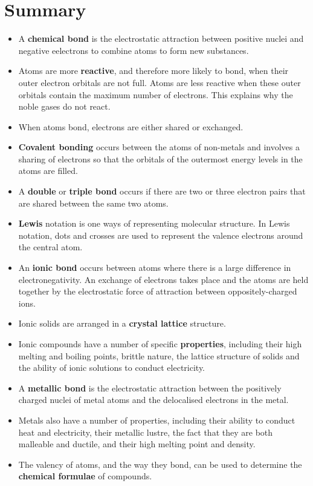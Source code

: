             \section{Summary}
            \nopagebreak
      \label{m38689*id147386}\begin{itemize}[noitemsep]
            \label{m38689*uid136}\item A \textbf{chemical bond} is the electrostatic attraction between positive nuclei and negative eelectrons to combine atoms to form new substances.
\label{m38689*uid137}\item Atoms are more \textbf{reactive}, and therefore more likely to bond, when their outer electron orbitals are not full. Atoms are less reactive when these outer orbitals contain the maximum number of electrons. This explains why the noble gases do not react.
\label{m38689*uid142}\item When atoms bond, electrons are either shared or exchanged.
\label{m38689*uid143}\item \textbf{Covalent bonding} occurs between the atoms of non-metals and involves a sharing of electrons so that the orbitals of the outermost energy levels in the atoms are filled.
\label{m38689*uid145}\item A \textbf{double} or \textbf{triple bond} occurs if there are two or three electron pairs that are shared between the same two atoms.
\label{m38689*uid147}\item \textbf{Lewis} notation is one ways of representing molecular structure. In Lewis notation, dots and crosses are used to represent the valence electrons around the central atom.
\label{m38689*uid150}\item An \textbf{ionic bond} occurs between atoms where there is a large difference in electronegativity. An exchange of electrons takes place and the atoms are held together by the electrostatic force of attraction between oppositely-charged ions.
\label{m38689*uid151}\item Ionic solids are arranged in a \textbf{crystal lattice} structure.
\label{m38689*uid152}\item Ionic compounds have a number of specific \textbf{properties}, including their high melting and boiling points, brittle nature, the lattice structure of solids and the ability of ionic solutions to conduct electricity.
\label{m38689*uid153}\item A \textbf{metallic bond} is the electrostatic attraction between the positively charged nuclei of metal atoms and the delocalised electrons in the metal.
\label{m38689*uid154}\item Metals also have a number of properties, including their ability to conduct heat and electricity, their metallic lustre, the fact that they are both malleable and ductile, and their high melting point and density.
\label{m38689*uid155}\item The valency of atoms, and the way they bond, can be used to determine the \textbf{chemical formulae} of compounds.
\end{itemize}
